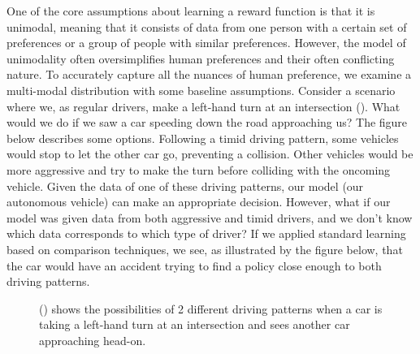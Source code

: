 \documentclass[
  letterpaper,
  numbers=noenddot,
  DIV=11]{scrreprt}
\theoremstyle{definition}
\theoremstyle{plain}
\theoremstyle{plain}
\theoremstyle{remark}
\begin{document}
One of the core assumptions about learning a reward function is that it
is unimodal, meaning that it consists of data from one person with a
certain set of preferences or a group of people with similar
preferences. However, the model of unimodality often oversimplifies
human preferences and their often conflicting nature. To accurately
capture all the nuances of human preference, we examine a multi-modal
distribution with some baseline assumptions. Consider a scenario where
we, as regular drivers, make a left-hand turn at an intersection
(). What would we do
if we saw a car speeding down the road approaching us? The figure below
describes some options. Following a timid driving pattern, some vehicles
would stop to let the other car go, preventing a collision. Other
vehicles would be more aggressive and try to make the turn before
colliding with the oncoming vehicle. Given the data of one of these
driving patterns, our model (our autonomous vehicle) can make an
appropriate decision. However, what if our model was given data from
both aggressive and timid drivers, and we don't know which data
corresponds to which type of driver? If we applied standard learning
based on comparison techniques, we see, as illustrated by the figure
below, that the car would have an accident trying to find a policy close
enough to both driving patterns.

\begin{figure}


\caption{\label{fig-driving-patt}() shows the possibilities of 2 different driving patterns
when a car is taking a left-hand turn at an intersection and sees
another car approaching head-on.}

\end{figure}%
\end{document}
